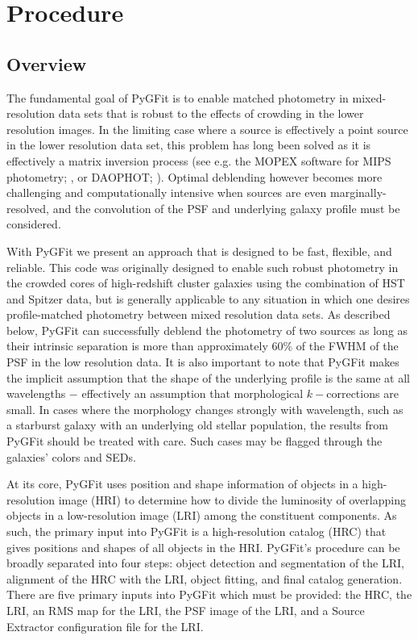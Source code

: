 \documentclass[apj]{emulateapj}
\newcommand{\pygfit}{PyGFit}
\newcommand{\extractor}{Source Extractor}
\begin{document}
\section{Procedure}\label{sec:procedure}

\subsection{Overview}

The fundamental goal of \pygfit{} is to enable matched photometry in mixed-resolution data sets that is robust to the effects of crowding in the lower resolution images. In the limiting case where a source is effectively a point source in the lower resolution data set, this problem has long been solved as it is effectively a matrix inversion process (see e.g. the MOPEX software for MIPS photometry; \citealt{mopex}, or DAOPHOT; \citealt{stetson87}). Optimal deblending however becomes more challenging and computationally intensive when sources are even marginally-resolved, and the convolution of the PSF and underlying galaxy profile must be considered. 

With \pygfit{} we present an approach that is designed to be fast, flexible, and reliable. This code was originally designed to enable such robust photometry in the crowded cores of high-redshift cluster galaxies using the combination of HST and Spitzer data, but is generally applicable to any situation in which one desires profile-matched photometry between mixed resolution data sets. As described below, \pygfit{} can successfully deblend the photometry of two sources as long as their intrinsic separation is more than approximately $60\%$ of the FWHM of the PSF in the low resolution data.  It is also important to note that \pygfit{} makes the implicit assumption that the shape of the underlying profile is the same at all wavelengths $-$ effectively an assumption that morphological $k-$corrections are small. In cases where the morphology changes strongly with wavelength, such as a starburst galaxy with an underlying old stellar population, the results from \pygfit{} should be treated with care.  Such cases may be flagged through the galaxies' colors and SEDs.

At its core, \pygfit{} uses position and shape information of objects in a high-resolution image (HRI) to determine how to divide the luminosity of overlapping objects in a low-resolution image (LRI) among the constituent components.  As such, the primary input into \pygfit{} is a high-resolution catalog (HRC) that gives positions and shapes of all objects in the HRI.  \pygfit{}'s procedure can be broadly separated into four steps: object detection and segmentation of the LRI, alignment of the HRC with the LRI, object fitting, and final catalog generation.  There are five primary inputs into \pygfit{} which must be provided: the HRC, the LRI, an RMS map for the LRI, the PSF image of the LRI, and a \extractor{} configuration file for the LRI.
\end{document}
